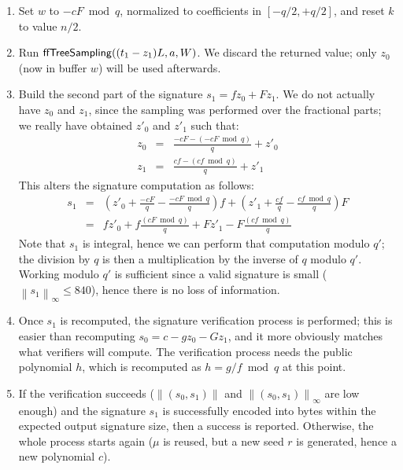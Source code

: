 \documentclass{llncs}
\newcommand{\norm}[1]{\left\|#1\right\|}
\newcommand{\norminf}[1]{\norm{#1}_{\infty}}
\begin{document}
\begin{enumerate}
    \item Set $w$ to $-cF \bmod q$, normalized to coefficients in
    $[-q/2, +q/2]$, and reset $k$ to value $n/2$.

    \item Run $\text{\textsf{ffTreeSampling}}((t_1 - z_1)L, a, W)$.
    We discard the returned value; only $z_0$ (now in buffer $w$)
    will be used afterwards.

    \item Build the second part of the signature $s_1 = f z_0 + F z_1$.
    We do not actually have $z_0$ and $z_1$, since the sampling was
    performed over the fractional parts; we really have obtained
    $z'_0$ and $z'_1$ such that:
    \begin{eqnarray*}
        z_0 &=& \frac{-cF - (-cF \bmod q)}{q} + z'_0 \\
        z_1 &=& \frac{cf - (cf \bmod q)}{q} + z'_1
    \end{eqnarray*}
    This alters the signature computation as follows:
    \begin{eqnarray*}
        s_1 &=& \left(z'_0 + \frac{-cF}{q} - \frac{-cF \bmod q}{q}\right) f
                + \left(z'_1 + \frac{cf}{q} - \frac{cf \bmod q}{q}\right) F \\
            &=& f z'_0 + f \frac{(cF \bmod q)}{q}
                + F z'_1 - F \frac{(cf \bmod q)}{q}
    \end{eqnarray*}
    Note that $s_1$ is integral, hence we can perform that computation
    modulo $q'$; the division by $q$ is then a multiplication by the
    inverse of $q$ modulo $q'$. Working modulo $q'$ is sufficient since
    a valid signature is small ($\norminf{s_1} \leq 840$), hence there
    is no loss of information.

    \item Once $s_1$ is recomputed, the signature verification process is
    performed; this is easier than recomputing $s_0 = c - g z_0 - G z_1$,
    and it more obviously matches what verifiers will compute. The
    verification process needs the public polynomial $h$, which is
    recomputed as $h = g/f \bmod q$ at this point.

    \item If the verification succeeds ($\norm{(s_0, s_1)}$ and
    $\norminf{(s_0, s_1)}$ are low enough) and the signature $s_1$ is
    successfully encoded into bytes within the expected output signature
    size, then a success is reported. Otherwise, the whole process starts
    again ($\mu$ is reused, but a new seed $r$ is generated, hence a new
    polynomial $c$).

\end{enumerate}
\end{document}
